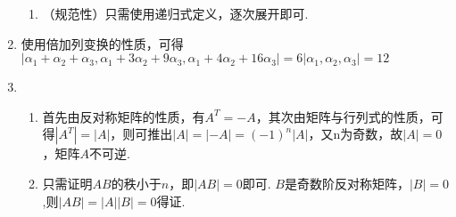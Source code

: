\begin{enumerate}
\begin{enumerate}
        \item （规范性）只需使用递归式定义，逐次展开即可.
    \end{enumerate}

\item 使用倍加列变换的性质，可得$|\alpha_1+\alpha_2+\alpha_3,\alpha_1+3\alpha_2+9\alpha_3,\alpha_1+4\alpha_2+16\alpha_3|=6|\alpha_1,\alpha_2,\alpha_3|=12$

\item \begin{enumerate}
        \item 首先由反对称矩阵的性质，有$A^T=-A$，其次由矩阵与行列式的性质，可得$|A^T|=|A|$，则可推出$|A|=|-A|=(-1)^n|A|$，又n为奇数，故$|A|=0$，矩阵$A$不可逆.

        \item 只需证明$AB$的秩小于$n$，即$|AB|=0$即可. $B$是奇数阶反对称矩阵，$|B|=0$,则$|AB|=|A||B|=0$得证.
    \end{enumerate}


\end{enumerate}
